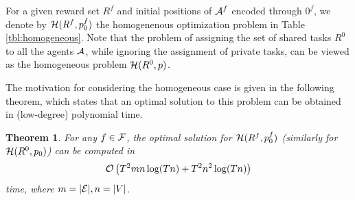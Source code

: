 \documentclass[conference]{IEEEtran}
\newtheorem{theorem}{Theorem}[section]
\begin{document}
For a given reward set $R^f$ and initial positions of $\mathcal{A}^f$ encoded through $0^f$, we denote by  $\mathcal{H}(R^f, p_0^f)$ the homogenenous optimization problem in Table \ref{tbl:homogeneous}. %
Note that the problem of assigning the set of shared tasks $R^0$ to all the agents $\mathcal{A}$, while ignoring the assignment of private tasks, can be viewed as the homogeneous problem $\mathcal{H}(R^0,p)$.
 
The motivation for considering the homogeneous case is given in the following theorem, which states that an optimal solution to this problem can be obtained in (low-degree) polynomial time.

\begin{theorem}\label{thm:homogeneous}
  For any $f\in \mathcal{F}$, the optimal solution for $\mathcal{H}(R^f, p^f_0)$ (similarly for $\mathcal{H}(R^0,p_0)$) can be computed in 
  $$\mathcal{O}\left(T^2mn\log (Tn)+T^2n^2\log (Tn)\right)$$
  time, where $m=|\mathcal{E}|,n=|V|$. 
\end{theorem}
\end{document}
